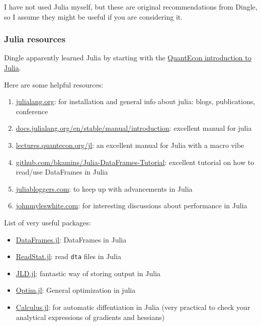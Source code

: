 I have not used Julia myself, but these are original recommendations from Dingle, so I assume they might be useful if you are considering it.

\subsubsection{Julia resources}
Dingle apparently learned Julia by starting with the \href{https://lectures.quantecon.org/jl/index_learning_julia.html}{QuantEcon introduction to Julia}.

Here are some helpful resources:
\begin{enumerate}
\item \href{https://julialang.org}{julialang.org}: for installation and general info about julia: blogs, publications, conference
\item \href{https://docs.julialang.org/en/stable/manual/introduction/}{docs.julialang.org/en/stable/manual/introduction}: excellent manual for julia
\item \href{https://lectures.quantecon.org/jl/}{lectures.quantecon.org/jl}: an excellent manual for Julia with a macro vibe
\item \href{https://github.com/bkamins/Julia-DataFrames-Tutorial}{github.com/bkamins/Julia-DataFrames-Tutorial}: excellent tutorial on how to read/use DataFrames in Julia
\item \href{https://www.juliabloggers.com/}{juliabloggers.com}: to keep up with advancements in Julia
\item \href{http://www.johnmyleswhite.com/}{johnmyleswhite.com}: for interesting discussions about performance in Julia 
\end{enumerate}

List of very useful packages:
\begin{itemize}
\item \href{https://github.com/JuliaData/DataFrames.jl}{DataFrames.jl}: DataFrames in Julia
\item \href{https://github.com/davidanthoff/ReadStat.jl}{ReadStat.jl}: read \texttt{dta} files in Julia
\item \href{https://github.com/JuliaIO/JLD.jl}{JLD.jl}: fantastic way of storing output in Julia
\item \href{https://github.com/JuliaNLSolvers/Optim.jl}{Optim.jl}: General optimization in julia
\item \href{https://github.com/johnmyleswhite/Calculus.jl}{Calculus.jl}: for automatic diffentiation in Julia (very practical to check your analytical expressions of gradients and hessians)
\end{itemize}

